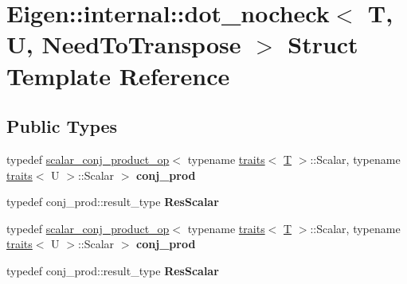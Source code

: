 \hypertarget{struct_eigen_1_1internal_1_1dot__nocheck}{}\section{Eigen\+:\+:internal\+:\+:dot\+\_\+nocheck$<$ T, U, Need\+To\+Transpose $>$ Struct Template Reference}
\label{struct_eigen_1_1internal_1_1dot__nocheck}
\subsection*{Public Types}
\begin{DoxyCompactItemize}
\item 
\mbox{\label{struct_eigen_1_1internal_1_1dot__nocheck_abf2c27baaf29d5b30c6e6c4683e4b85a}} 
typedef \hyperlink{struct_eigen_1_1internal_1_1scalar__conj__product__op}{scalar\+\_\+conj\+\_\+product\+\_\+op}$<$ typename \hyperlink{struct_eigen_1_1internal_1_1traits}{traits}$<$ \hyperlink{group___sparse_core___module}{T} $>$\+::Scalar, typename \hyperlink{struct_eigen_1_1internal_1_1traits}{traits}$<$ U $>$\+::Scalar $>$ {\bfseries conj\+\_\+prod}
\item 
\mbox{\label{struct_eigen_1_1internal_1_1dot__nocheck_a13097f7d273a417cbdc3556f5e500c42}} 
typedef conj\+\_\+prod\+::result\+\_\+type {\bfseries Res\+Scalar}
\item 
\mbox{\label{struct_eigen_1_1internal_1_1dot__nocheck_abf2c27baaf29d5b30c6e6c4683e4b85a}} 
typedef \hyperlink{struct_eigen_1_1internal_1_1scalar__conj__product__op}{scalar\+\_\+conj\+\_\+product\+\_\+op}$<$ typename \hyperlink{struct_eigen_1_1internal_1_1traits}{traits}$<$ \hyperlink{group___sparse_core___module}{T} $>$\+::Scalar, typename \hyperlink{struct_eigen_1_1internal_1_1traits}{traits}$<$ U $>$\+::Scalar $>$ {\bfseries conj\+\_\+prod}
\item 
\mbox{\label{struct_eigen_1_1internal_1_1dot__nocheck_a13097f7d273a417cbdc3556f5e500c42}} 
typedef conj\+\_\+prod\+::result\+\_\+type {\bfseries Res\+Scalar}
\end{DoxyCompactItemize}
